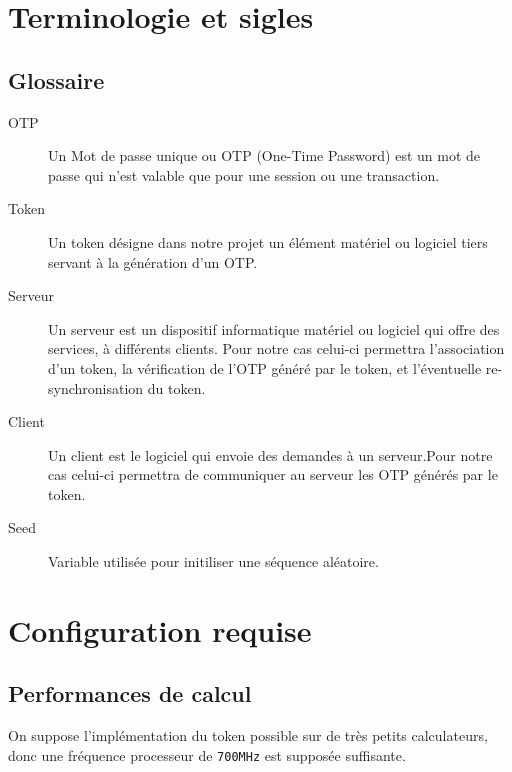 \documentclass{"../../res/univ-projet"}
\begin{document}
\section{Terminologie et sigles}
\subsection{Glossaire}
\begin{description}
    \item[OTP] Un Mot de passe unique ou OTP (One-Time Password) est un mot de 
    passe qui n'est valable que pour une session ou une transaction.

    \item[Token] Un token désigne dans notre projet un élément matériel ou
    logiciel tiers servant à la génération d'un OTP.

    \item[Serveur] Un serveur est un dispositif informatique matériel ou
    logiciel qui offre des services, à différents clients. Pour notre cas
    celui-ci permettra l'association d'un token, la v\'{e}rification de l'OTP
    g\'{e}n\'{e}r\'{e} par le token, et l'\'{e}ventuelle re-synchronisation du
    token.

    \item[Client] Un client est le logiciel qui envoie des demandes à un
    serveur.Pour notre cas celui-ci permettra de communiquer au serveur les OTP
    g\'{e}n\'{e}r\'{e}s par le token.
    
    \item[Seed] Variable utilis\'ee pour initiliser une s\'equence al\'eatoire.
\end{description}

\section{Configuration requise}
\subsection{Performances de calcul}
On suppose l'implémentation du token possible sur de très petits 
calculateurs, donc une fréquence processeur de \verb?700MHz? est
supposée suffisante.
\end{document}
